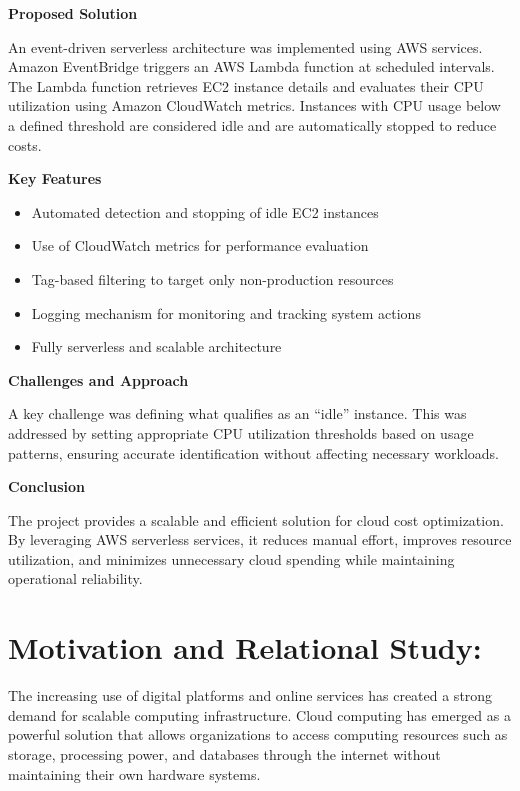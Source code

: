 \documentclass[12pt, a4paper, oneside]{report}
\begin{document}
\noindent\textbf{Proposed Solution}

An event-driven serverless architecture was implemented using AWS services. Amazon 
EventBridge triggers an AWS Lambda function at scheduled intervals. The Lambda 
function retrieves EC2 instance details and evaluates their CPU utilization using Amazon 
CloudWatch metrics. Instances with CPU usage below a defined threshold are considered 
idle and are automatically stopped to reduce costs.

\noindent\textbf{Key Features}
\begin{itemize}[leftmargin=1.5cm]
    \item Automated detection and stopping of idle EC2 instances
    \item Use of CloudWatch metrics for performance evaluation
    \item Tag-based filtering to target only non-production resources
    \item Logging mechanism for monitoring and tracking system actions
    \item Fully serverless and scalable architecture
\end{itemize}

\noindent\textbf{Challenges and Approach}

A key challenge was defining what qualifies as an ``idle'' instance. This was addressed 
by setting appropriate CPU utilization thresholds based on usage patterns, ensuring 
accurate identification without affecting necessary workloads.

\noindent\textbf{Conclusion}

The project provides a scalable and efficient solution for cloud cost optimization. By 
leveraging AWS serverless services, it reduces manual effort, improves resource 
utilization, and minimizes unnecessary cloud spending while maintaining operational 
reliability.

\newpage
\section{Motivation and Relational Study:}

The increasing use of digital platforms and online services has created a strong demand 
for scalable computing infrastructure. Cloud computing has emerged as a powerful 
solution that allows organizations to access computing resources such as storage, 
processing power, and databases through the internet without maintaining their own 
hardware systems.
\end{document}
